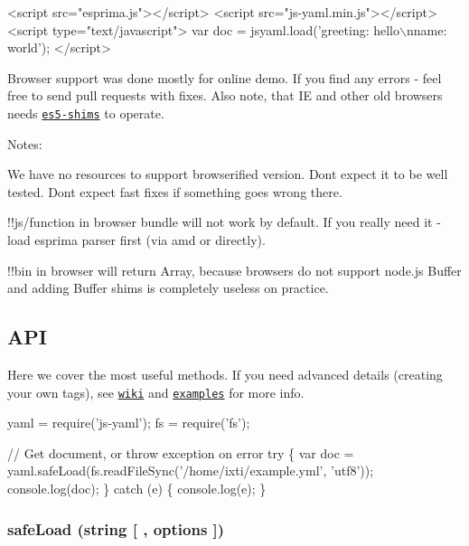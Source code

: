 \begin{DoxyCode}
<script src="esprima.js"></script>
<script src="js-yaml.min.js"></script>
<script type="text/javascript">
var doc = jsyaml.load('greeting: hello\(\backslash\)nname: world');
</script>
\end{DoxyCode}


Browser support was done mostly for online demo. If you find any errors -\/ feel free to send pull requests with fixes. Also note, that IE and other old browsers needs \href{https://github.com/kriskowal/es5-shim}{\tt es5-\/shims} to operate.

Notes\+:


\begin{DoxyEnumerate}
\item We have no resources to support browserified version. Don\textquotesingle{}t expect it to be well tested. Don\textquotesingle{}t expect fast fixes if something goes wrong there.
\item {\ttfamily !!js/function} in browser bundle will not work by default. If you really need it -\/ load {\ttfamily esprima} parser first (via amd or directly).
\item {\ttfamily !!bin} in browser will return {\ttfamily Array}, because browsers do not support node.\+js {\ttfamily Buffer} and adding Buffer shims is completely useless on practice.
\end{DoxyEnumerate}

\subsection*{A\+PI }

Here we cover the most \textquotesingle{}useful\textquotesingle{} methods. If you need advanced details (creating your own tags), see \href{https://github.com/nodeca/js-yaml/wiki}{\tt wiki} and \href{https://github.com/nodeca/js-yaml/tree/master/examples}{\tt examples} for more info.


\begin{DoxyCode}
yaml = require('js-yaml');
fs   = require('fs');

// Get document, or throw exception on error
try \{
  var doc = yaml.safeLoad(fs.readFileSync('/home/ixti/example.yml', 'utf8'));
  console.log(doc);
\} catch (e) \{
  console.log(e);
\}
\end{DoxyCode}


\subsubsection*{safe\+Load (string \mbox{[} , options \mbox{]})}

